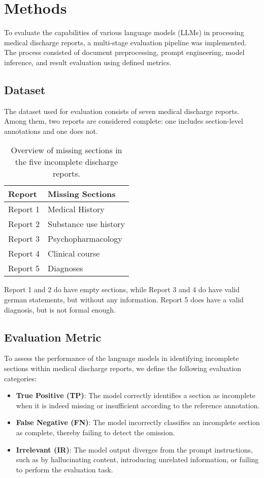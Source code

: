 \section{Methods}

To evaluate the capabilities of various language models (LLMs) in 
processing medical discharge reports, a multi-stage evaluation pipeline 
was implemented. The process consisted of document preprocessing, 
prompt engineering, model inference, and result evaluation using defined metrics.

\subsection{Dataset}
The dataset used for evaluation consists of seven medical discharge reports. 
Among them, two reports are considered complete: one includes section-level 
annotations and one does not. 
\begin{table}[H]
\centering
\begin{tabular}{l l}
\toprule
\textbf{Report} & \textbf{Missing Sections} \\
\midrule
Report 1 & Medical History \\
Report 2 & Substance use history \\
Report 3 & Psychopharmacology \\
Report 4 & Clinical course \\
Report 5 & Diagnoses \\
\bottomrule
\end{tabular}
\caption{Overview of missing sections in the five incomplete discharge reports.}
\label{tab:missing_sections}
\end{table}
Report 1 and 2 do have empty sections, while Report 3 and 4 do have valid
german statements, but without any information. Report 5 does have a valid
diagnosis, but is not formal enough.

\subsection{Evaluation Metric}
To assess the performance of the language models in identifying incomplete sections within medical discharge reports, we define the following evaluation categories:
\begin{itemize}
  \item \textbf{True Positive (TP)}: The model correctly identifies a section as incomplete when it is indeed missing or insufficient according to the reference annotation.
  \item \textbf{False Negative (FN)}: The model incorrectly classifies an incomplete section as complete, thereby failing to detect the omission.
  \item \textbf{Irrelevant (IR)}: The model output diverges from the prompt instructions, such as by hallucinating content, introducing unrelated information, or failing to perform the evaluation task.
\end{itemize}

